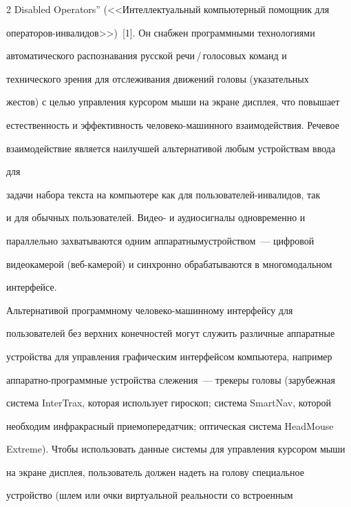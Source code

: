 \begin{multicols}{2}
Disabled Operators'' (<<Интеллектуальный компьютерный помощник для 


операторов-инвалидов>>)~[1]. Он снабжен программными технологиями 


автоматического распознавания русской речи\,/\,го\-ло\-со\-вых команд и 


технического зрения для отслеживания движений головы (указательных 


жес\-тов) с целью управления курсором \mbox{мыши} на экране дисплея, что повышает 


естественность и эффективность че\-ло\-ве\-ко-машинного взаимодействия. Речевое 


взаимодействие является наилучшей альтернативой любым устройствам ввода 


для\linebreak


 задачи набора текста на компьютере как для поль\-зовате\-лей-ин\-ва\-ли\-дов, так 


и для обычных пользователей. Видео- и аудиосигналы одновременно и 


па\-раллельно захватываются одним аппаратным\linebreak устройством~--- цифровой 


видеокамерой (веб-ка\-ме\-рой) и синхронно обрабатываются в многомодальном 


интерфейсе.


  


  Альтернативой программному человеко-ма\-шин\-но\-му интерфейсу для 


пользователей без верхних конечностей могут служить различные аппа\-ратные 


устройства для управления графическим интерфей\-сом компьютера, например 


ап\-па\-рат\-но-про\-грам\-мные устройства слежения~--- трекеры головы (зарубежная 


сис\-те\-ма InterTrax, которая использует гироскоп; сис\-те\-ма SmartNav, которой 


\mbox{необходим} инфракрасный приемопередатчик; оптическая сис\-те\-ма HeadMouse 


Extreme). Чтобы использовать данные системы для управления курсором мыши 


на экране дисплея, пользователь должен надеть на голову специальное 


устройство (шлем или очки виртуальной реальности со встроенным 



\end{multicols}

